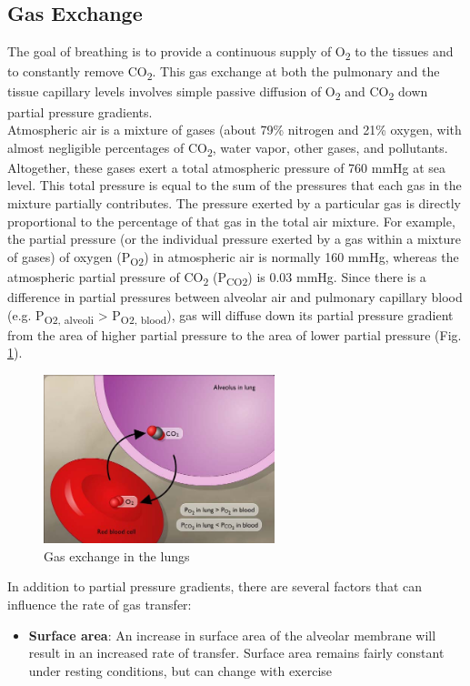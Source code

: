 \documentclass{article}
\begin{document}
\subsection*{Gas Exchange}
The goal of breathing is to provide a continuous supply of O\textsubscript{2} to the tissues and to constantly remove CO\textsubscript{2}. This gas exchange at both the pulmonary and the tissue capillary levels involves simple passive diffusion of O\textsubscript{2} and CO\textsubscript{2} down partial pressure gradients.\\

Atmospheric air is a mixture of gases (about 79\% nitrogen and 21\% oxygen, with almost negligible percentages of CO\textsubscript{2}, water vapor, other gases, and pollutants. Altogether, these gases exert a total atmospheric pressure of 760 mmHg at sea level. This total pressure is equal to the sum of the pressures that each gas in the mixture partially contributes. The pressure exerted by a particular gas is directly proportional to the percentage of that gas in the total air mixture. For example, the partial pressure (or the individual pressure exerted by a gas within a mixture of gases) of oxygen (P\textsubscript{O2}) in atmospheric air is normally 160 mmHg, whereas the atmospheric partial pressure of CO\textsubscript{2} (P\textsubscript{CO2}) is 0.03 mmHg. Since there is a difference in partial pressures between alveolar air and pulmonary capillary blood (e.g. P\textsubscript{O2, alveoli} > P\textsubscript{O2, blood}), gas will diffuse down its partial pressure gradient from the area of higher partial pressure to the area of lower partial pressure (Fig. \ref{partial}).

\begin{figure}[h]
\centering\includegraphics[width=0.6\textwidth]{../images/PF_II_1.jpg}
\caption{Gas exchange in the lungs}
\label{partial}
\end{figure}

In addition to partial pressure gradients, there are several factors that can influence the rate of gas transfer:
\begin{itemize}
	\item \textbf{Surface area}: An increase in surface area of the alveolar membrane will result in an increased rate of transfer. Surface area remains fairly constant under resting conditions, but can change with exercise
\end{itemize}
\end{document}
